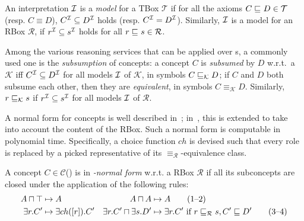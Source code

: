 An interpretation \(\mathcal{I}\) is a \emph{model} for a TBox \(\mathcal{T}\) if for all the axioms \(C \sqsubseteq_{\mathcal{}} D \in \mathcal{T}\) (resp. \(C \equiv D\)), \(C^{\mathcal{I}} \subseteq D^{\mathcal{I}}\) holds (resp. \(C^{\mathcal{I}} = D^{\mathcal{I}}\)).
Similarly, \(\mathcal{I}\) is a model for an RBox \(\mathcal{R}\), if \(r^{\mathcal{I}} \subseteq s^{\mathcal{I}}\) holds for all \(r \sqsubseteq_{\mathcal{}} s \in \mathcal{R}\).

Among the various reasoning services that can be applied over \elh \kb{}s, a commonly used one is the \emph{subsumption} of concepts: a concept \(C\) is \emph{subsumed} by \(D\) w.r.t.\ a \kb \(\mathcal{K}\) iff \(C^{\mathcal{I}} \subseteq D^{\mathcal{I}}\) for all models \(\mathcal{I}\) of \(\mathcal{K}\), in symbols \(C \sqsubseteq_{\mathcal{K}} D\); if \(C\) and \(D\) both subsume each other, then they are \emph{equivalent}, in symbols \(C \equiv_{\mathcal{K}} D\).
Similarly, \(r \sqsubseteq_{\mathcal{K}} s\) if \(r^{\mathcal{I}} \subseteq s^{\mathcal{I}}\) for all models \(\mathcal{I}\) of \(\mathcal{R}\).

A normal form for \el concepts is well described in~\cite{DLbook}; in~\cite{LeTu12}, this is extended to take into account the content of the RBox.
Such a normal form is computable in polynomial time.
Specifically, a choice function \(ch{}\) is devised such that every role is replaced by a picked representative of its \(\equiv_\mathcal{R}\)-equivalence class.
\begin{definition}
  \label{dfn:elh-nf}
  A concept \(C \in \mathcal{C}\)(\elh) is in \emph{\elh-normal form} w.r.t. a RBox \(\mathcal{R}\) if all its subconcepts are closed under the application of the following rules:
  \begin{align*}
    A \sqcap \top &\mapsto A & A \sqcap A &\mapsto A \tag{1--2}\\
    \exists{}r.C^\prime &\mapsto \exists{}ch([r]).C^\prime &
    \exists{}r.C^\prime \sqcap \exists{}s.D^\prime &\mapsto
    \exists{}r.C^\prime\,\,\text{if}\,\,r\sqsubseteq_{\mathcal{R}}s, C^\prime \sqsubseteq D^\prime \tag{3--4}
  \end{align*}
\end{definition}
